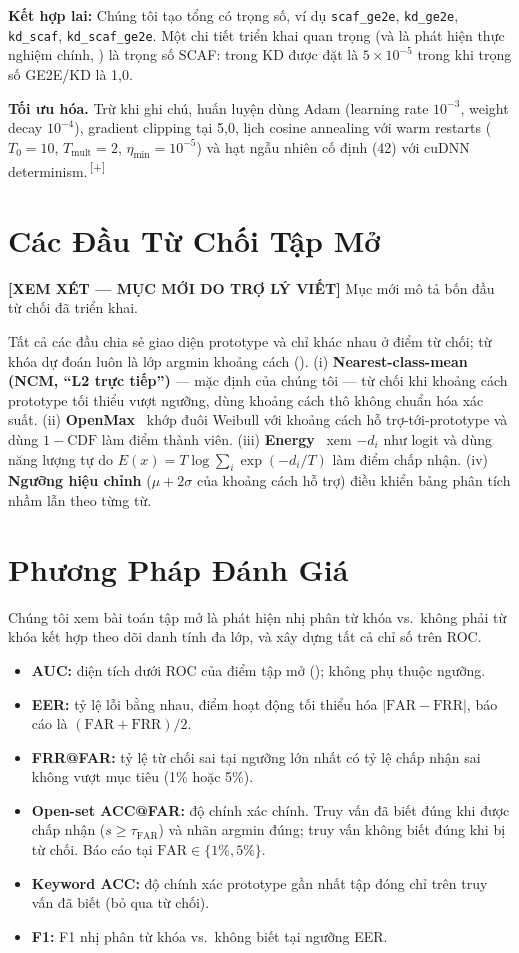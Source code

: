 \documentclass[12pt,a4paper]{report}
\newcommand{\NEW}[1]{{\color{addcolor}#1\,\textsuperscript{\tiny[+]}}}
\newcommand{\reviewnote}[1]{%
  \par\smallskip\noindent
  \colorbox{yellow!35}{\parbox{0.97\linewidth}{\small\textbf{[XEM XÉT — MỤC MỚI DO TRỢ LÝ VIẾT]}\; #1}}%
  \par\smallskip}
\newcommand{\code}[1]{\texttt{\small #1}}
\newcommand{\far}{\text{FAR}}
\newcommand{\frr}{\text{FRR}}
\begin{document}
\textbf{Kết hợp lai:} Chúng tôi tạo tổng có trọng số, ví dụ \code{scaf\_ge2e},
\code{kd\_ge2e}, \code{kd\_scaf}, \code{kd\_scaf\_ge2e}. Một chi tiết triển khai
quan trọng (và là phát hiện thực nghiệm chính, ) là trọng số
SCAF: trong KD được đặt là $5\times10^{-5}$ trong khi trọng số GE2E/KD là 1{,}0.

\NEW{\textbf{Tối ưu hóa.} Trừ khi ghi chú, huấn luyện dùng Adam (learning rate
$10^{-3}$, weight decay $10^{-4}$), gradient clipping tại 5{,}0, lịch cosine
annealing với warm restarts ($T_0{=}10$, $T_{\text{mult}}{=}2$,
$\eta_{\min}{=}10^{-5}$) và hạt ngẫu nhiên cố định (42) với cuDNN determinism.}

\section{Các Đầu Từ Chối Tập Mở}\label{sec:openset}
\reviewnote{Mục mới mô tả bốn đầu từ chối đã triển khai.}

Tất cả các đầu chia sẻ giao diện prototype và chỉ khác nhau ở điểm từ chối; từ
khóa dự đoán luôn là lớp argmin khoảng cách ().
(i) \textbf{Nearest-class-mean (NCM, ``L2 trực tiếp'')} --- mặc định của chúng
tôi --- từ chối khi khoảng cách prototype tối thiểu vượt ngưỡng, dùng khoảng cách
thô không chuẩn hóa xác suất.
(ii) \textbf{OpenMax}~\cite{bendale2016openmax} khớp đuôi Weibull với khoảng cách
hỗ trợ-tới-prototype và dùng $1-\text{CDF}$ làm điểm thành viên.
(iii) \textbf{Energy}~\cite{liu2020energy} xem $-d_i$ như logit và dùng năng
lượng tự do $E(x)=T\log\sum_i\exp(-d_i/T)$ làm điểm chấp nhận.
(iv) \textbf{Ngưỡng hiệu chỉnh} ($\mu+2\sigma$ của khoảng cách hỗ trợ) điều
khiển bảng phân tích nhầm lẫn theo từng từ.

\section{Phương Pháp Đánh Giá}\label{sec:eval}

Chúng tôi xem bài toán tập mở là phát hiện nhị phân từ khóa vs.\ không phải từ
khóa kết hợp theo dõi danh tính đa lớp, và xây dựng tất cả chỉ số trên ROC.
\begin{itemize}[leftmargin=1.3em,itemsep=1pt]
\item \textbf{AUC:} diện tích dưới ROC của điểm tập mở ();
không phụ thuộc ngưỡng.
\item \textbf{EER:} tỷ lệ lỗi bằng nhau, điểm hoạt động tối thiểu hóa
$|\far-\frr|$, báo cáo là $(\far+\frr)/2$.
\item \textbf{FRR@FAR:} tỷ lệ từ chối sai tại ngưỡng lớn nhất có tỷ lệ chấp
nhận sai không vượt mục tiêu (1\% hoặc 5\%).
\item \textbf{Open-set ACC@FAR:} độ chính xác chính. Truy vấn đã biết đúng khi
được chấp nhận ($s\ge\tau_{\far}$) và nhãn argmin đúng; truy vấn không biết đúng
khi bị từ chối. Báo cáo tại $\far\in\{1\%, 5\%\}$.
\item \textbf{Keyword ACC:} độ chính xác prototype gần nhất tập đóng chỉ trên
truy vấn đã biết (bỏ qua từ chối).
\item \textbf{F1:} F1 nhị phân từ khóa vs.\ không biết tại ngưỡng EER.
\end{itemize}
\end{document}
